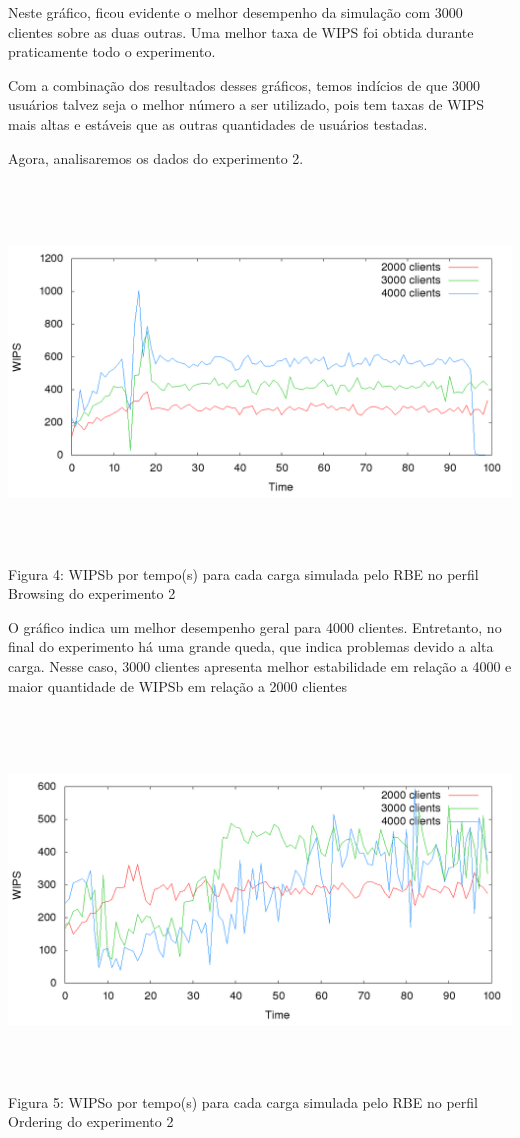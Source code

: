 \documentclass[11pt,twoside]{article}
\begin{document}
Neste gráfico, ficou evidente o melhor desempenho da simulação com 3000 clientes sobre as duas outras. Uma melhor taxa de WIPS foi obtida durante praticamente todo o experimento.

Com a combinação dos resultados desses gráficos, temos indícios de que 3000 usuários talvez seja o melhor número a ser utilizado, pois tem taxas de WIPS mais altas e estáveis que as outras quantidades de usuários testadas.

Agora, analisaremos os dados do experimento 2.

\begin{center}
\includegraphics[width=15cm, height=10cm]{images/exp2/plot_browsin}
Figura 4: WIPSb por tempo(s) para cada carga simulada pelo RBE no perfil Browsing do experimento 2
\end{center}

O gráfico indica um melhor desempenho geral para 4000 clientes. Entretanto, no final do experimento há uma grande queda, que indica problemas devido a alta carga. Nesse caso, 3000 clientes apresenta melhor estabilidade em relação a 4000 e maior quantidade de WIPSb em relação a 2000 clientes

\begin{center}
\includegraphics[width=15cm, height=10cm]{images/exp2/plot_ordering}
Figura 5: WIPSo por tempo(s) para cada carga simulada pelo RBE no perfil Ordering do experimento 2
\end{center}
\end{document}
